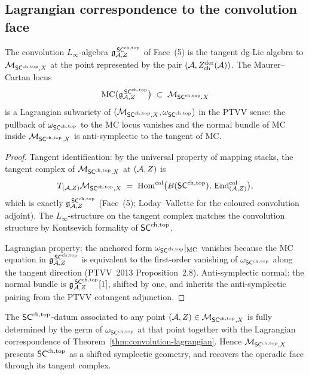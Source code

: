 \subsection{Lagrangian correspondence to the convolution face}\label{subsec:lagrangian-corr}

\begin{theorem}
\label{thm:convolution-lagrangian}%
%
The convolution $L_\infty$-algebra
$\mathfrak{g}^{\,\mathsf{SC}^{\mathrm{ch},\mathrm{top}}}_{\mathcal{A},Z}$ of Face~(5) is the tangent dg-Lie
algebra to $\mathcal{M}_{\mathsf{SC}^{\mathrm{ch},\mathrm{top}},X}$ at the point represented by
the pair $(\mathcal{A},Z^{\mathrm{der}}_{\mathrm{ch}}(\mathcal{A}))$. The Maurer--Cartan
locus
\begin{equation}
 \mathrm{MC}\bigl(\mathfrak{g}^{\,\mathsf{SC}^{\mathrm{ch},\mathrm{top}}}_{\mathcal{A},Z}\bigr)
 \;\subset\;
 \mathcal{M}_{\mathsf{SC}^{\mathrm{ch},\mathrm{top}},X}
\end{equation}
is a Lagrangian subvariety of
$(\mathcal{M}_{\mathsf{SC}^{\mathrm{ch},\mathrm{top}},X},\omega_{\mathsf{SC}^{\mathrm{ch},\mathrm{top}}})$ in the PTVV sense: the
pullback of $\omega_{\mathsf{SC}^{\mathrm{ch},\mathrm{top}}}$ to the MC locus vanishes and the
normal bundle of MC inside $\mathcal{M}_{\mathsf{SC}^{\mathrm{ch},\mathrm{top}},X}$ is anti-symplectic to
the tangent of MC.
\end{theorem}

\begin{proof}
Tangent identification: by the universal property of mapping stacks,
the tangent complex of $\mathcal{M}_{\mathsf{SC}^{\mathrm{ch},\mathrm{top}},X}$ at $(\mathcal{A},Z)$ is
\begin{equation}
 T_{(\mathcal{A},Z)}\mathcal{M}_{\mathsf{SC}^{\mathrm{ch},\mathrm{top}},X}
 \;=\;
 \mathrm{Hom}^{\mathrm{col}}\bigl(B(\mathsf{SC}^{\mathrm{ch},\mathrm{top}}),\,\mathrm{End}^{\mathrm{col}}_{(\mathcal{A},Z)}\bigr),
\end{equation}
which is exactly $\mathfrak{g}^{\,\mathsf{SC}^{\mathrm{ch},\mathrm{top}}}_{\mathcal{A},Z}$ (Face~(5); Loday--Vallette
 for the coloured convolution adjoint). The
$L_\infty$-structure on the tangent complex matches the
convolution structure by Kontsevich formality of $\mathsf{SC}^{\mathrm{ch},\mathrm{top}}$.

Lagrangian property: the anchored form
$\omega_{\mathsf{SC}^{\mathrm{ch},\mathrm{top}}}|_{\mathrm{MC}}$ vanishes because the MC equation in
$\mathfrak{g}^{\,\mathsf{SC}^{\mathrm{ch},\mathrm{top}}}_{\mathcal{A},Z}$ is equivalent to the first-order
vanishing of $\omega_{\mathsf{SC}^{\mathrm{ch},\mathrm{top}}}$ along the tangent direction (PTVV~2013
Proposition~2.8). Anti-symplectic normal: the normal bundle is
$\mathfrak{g}^{\,\mathsf{SC}^{\mathrm{ch},\mathrm{top}}}_{\mathcal{A},Z}[1]$, shifted by one, and inherits the
anti-symplectic pairing from the PTVV cotangent adjunction.
\end{proof}

\begin{corollary}
\label{cor:face-7-presents-sc}
The $\mathsf{SC}^{\mathrm{ch},\mathrm{top}}$-datum associated to any point $(\mathcal{A},Z)\in
\mathcal{M}_{\mathsf{SC}^{\mathrm{ch},\mathrm{top}},X}$ is fully determined by the germ of
$\omega_{\mathsf{SC}^{\mathrm{ch},\mathrm{top}}}$ at that point together with the Lagrangian
correspondence of Theorem~\ref{thm:convolution-lagrangian}.
Hence $\mathcal{M}_{\mathsf{SC}^{\mathrm{ch},\mathrm{top}},X}$ presents $\mathsf{SC}^{\mathrm{ch},\mathrm{top}}$ as a shifted
symplectic geometry, and recovers the operadic face through its
tangent complex.
\end{corollary}

